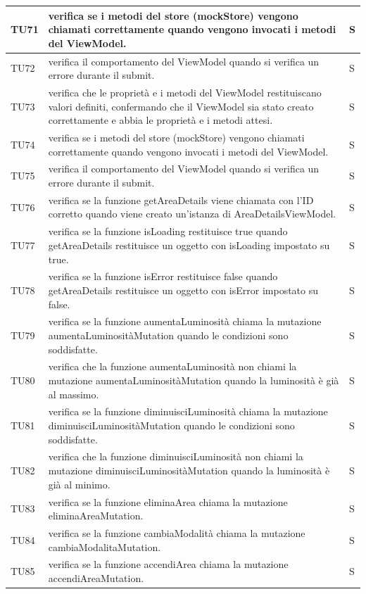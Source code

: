 \documentclass[12pt]{article}
\begin{document}
\begin{xltabular}{\linewidth}{|>{\hsize}X|X|>{\hsize}X|}
	TU71 & verifica se i metodi del store (mockStore) vengono chiamati correttamente quando vengono invocati i metodi del ViewModel. & S \\ \hline
	TU72 & verifica il comportamento del ViewModel quando si verifica un errore durante il submit. & S \\ \hline
	TU73 & verifica che le proprietà e i metodi del ViewModel restituiscano valori definiti, confermando che il ViewModel sia stato creato correttamente e abbia le proprietà e i metodi attesi. & S \\ \hline
	TU74 & verifica se i metodi del store (mockStore) vengono chiamati correttamente quando vengono invocati i metodi del ViewModel.  & S \\ \hline
	TU75 & verifica il comportamento del ViewModel quando si verifica un errore durante il submit. & S \\ \hline
	TU76 & verifica se la funzione getAreaDetails viene chiamata con l'ID corretto quando viene creato un'istanza di AreaDetailsViewModel. & S \\ \hline
	TU77 & verifica se la funzione isLoading restituisce true quando getAreaDetails restituisce un oggetto con isLoading impostato su true. & S \\ \hline
	TU78 & verifica se la funzione isError restituisce false quando getAreaDetails restituisce un oggetto con isError impostato su false. & S \\ \hline
	TU79 & verifica se la funzione aumentaLuminosità chiama la mutazione aumentaLuminositàMutation quando le condizioni sono soddisfatte. & S \\ \hline
	TU80 & verifica che la funzione aumentaLuminosità non chiami la mutazione aumentaLuminositàMutation quando la luminosità è già al massimo. & S \\ \hline
	TU81 & verifica se la funzione diminuisciLuminosità chiama la mutazione diminuisciLuminositàMutation quando le condizioni sono soddisfatte. & S \\ \hline
	TU82 & verifica che la funzione diminuisciLuminosità non chiami la mutazione diminuisciLuminositàMutation quando la luminosità è già al minimo. & S \\ \hline
	TU83 & verifica se la funzione eliminaArea chiama la mutazione eliminaAreaMutation. & S \\ \hline
	TU84 & verifica se la funzione cambiaModalità chiama la mutazione cambiaModalitaMutation. & S \\ \hline
	TU85 & verifica se la funzione accendiArea chiama la mutazione accendiAreaMutation. & S \\ \hline

\end{xltabular}
\end{document}
